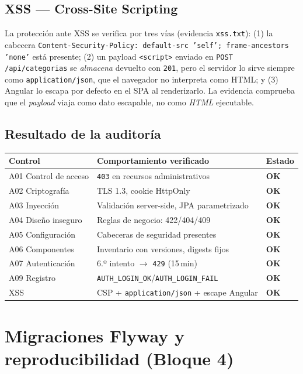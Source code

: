 \documentclass[11pt,a4paper]{article}
\newcommand{\ruta}[1]{\texttt{\footnotesize #1}}
\newcommand{\ok}{\textcolor{okverde}{\textbf{OK}}}
\begin{document}
\subsection{XSS --- Cross-Site Scripting}

La protección ante XSS se verifica por tres vías (evidencia
\ruta{xss.txt}): (1) la cabecera \texttt{Content-Security-Policy:
default-src 'self'; frame-ancestors 'none'} está presente; (2) un payload
\texttt{<script>} enviado en \texttt{POST /api/categorias} se \emph{almacena}
devuelto con \texttt{201}, pero el servidor lo sirve siempre como
\texttt{application/json}, que el navegador no interpreta como HTML; y (3)
Angular lo escapa por defecto en el SPA al renderizarlo. La evidencia
comprueba que el \emph{payload} viaja como dato escapable, no como \emph{HTML}
ejecutable.

\subsection{Resultado de la auditoría}

\begin{center}
\begin{tabular}{@{}lll@{}}
\toprule
\textbf{Control} & \textbf{Comportamiento verificado} & \textbf{Estado} \\
\midrule
A01 Control de acceso & \texttt{403} en recursos administrativos & \ok \\
A02 Criptografía & TLS 1.3, cookie HttpOnly & \ok \\
A03 Inyección & Validación server-side, JPA parametrizado & \ok \\
A04 Diseño inseguro & Reglas de negocio: 422/404/409 & \ok \\
A05 Configuración & Cabeceras de seguridad presentes & \ok \\
A06 Componentes & Inventario con versiones, digests fijos & \ok \\
A07 Autenticación & 6.º intento $\to$ \texttt{429} (15\,min) & \ok \\
A09 Registro & \texttt{AUTH\_LOGIN\_OK}/\texttt{AUTH\_LOGIN\_FAIL} & \ok \\
XSS & CSP + \texttt{application/json} + escape Angular & \ok \\
\bottomrule
\end{tabular}
\end{center}

\section{Migraciones Flyway y reproducibilidad (Bloque 4)}
\end{document}
